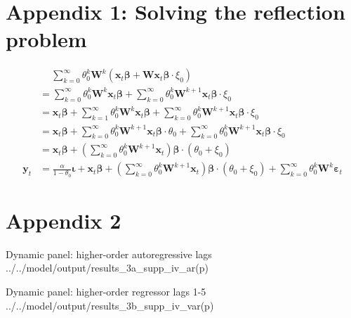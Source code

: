 \section*{Appendix 1: Solving the reflection problem}
\label{app-reflection-problem-instr-derivation}

\begin{align*}
    &\quad\ 
    \sum_{k=0}^{\infty} \theta_0^k \mathbf{W}^k (\mathbf{x}_t\boldsymbol{\beta}
    + \mathbf{W}\mathbf{x}_t \boldsymbol\beta \cdot \xi_0) 
    \\
    &= \sum_{k=0}^{\infty} \theta_0^k \mathbf{W}^k \mathbf{x}_t\boldsymbol{\beta} 
        + \sum_{k=0}^{\infty} \theta_0^k \mathbf{W}^{k+1} \mathbf{x}_t \boldsymbol\beta \cdot \xi_0
        \\
    &= \mathbf{x}_t\boldsymbol{\beta} 
        + \sum_{k=1}^{\infty} \theta_0^k \mathbf{W}^k \mathbf{x}_t\boldsymbol{\beta} 
        + \sum_{k=0}^{\infty} \theta_0^k \mathbf{W}^{k+1} \mathbf{x}_t \boldsymbol\beta \cdot \xi_0
        \\
    &= \mathbf{x}_t\boldsymbol{\beta} 
        + \sum_{k=0}^{\infty} \theta_0^k \mathbf{W}^{k+1} \mathbf{x}_t\boldsymbol{\beta} \cdot \theta_0
        + \sum_{k=0}^{\infty} \theta_0^k \mathbf{W}^{k+1} \mathbf{x}_t \boldsymbol\beta \cdot \xi_0
        \\
    &= \mathbf{x}_t\boldsymbol{\beta} 
        + \left( \sum_{k=0}^{\infty} \theta_0^k \mathbf{W}^{k+1} \mathbf{x}_t \right) 
        \boldsymbol\beta \cdot (\theta_0 + \xi_0)
        \\[1em]
    \mathbf{y}_t 
    &= \frac{\alpha}{1-\theta_0}\boldsymbol{\iota} 
        + \mathbf{x}_t\boldsymbol{\beta} 
        + \left( \sum_{k=0}^{\infty} \theta_0^k \mathbf{W}^{k+1} \mathbf{x}_t \right) 
        \boldsymbol\beta \cdot (\theta_0 + \xi_0) 
        + \sum_{k=0}^{\infty} \theta_0^k \mathbf{W}^k \boldsymbol{\varepsilon}_t
\end{align*}

\newpage
{}
\section*{Appendix 2}
\label{app-dynamic-panel-ho-ar}

\wraptable
    {Dynamic panel: higher-order autoregressive lags}
    {../../model/output/results_3a_supp_iv_ar(p)}
    {}

\wraptable
    {Dynamic panel: higher-order regressor lags 1-5}
    {../../model/output/results_3b_supp_iv_var(p)}
    {}

